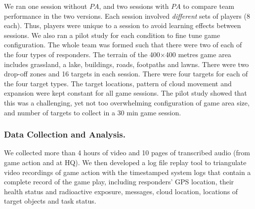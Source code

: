 We ran one session without $PA$, and two sessions with $PA$  to compare team performance in the two versions. Each session involved \emph{different} sets of players (8 each). Thus,  players were unique to a session to avoid learning effects between sessions. We also ran a pilot study for each condition to fine tune game configuration. The whole team was formed such that there were two of each of the four types of responders. The terrain of the 400$\times$400 metres  game area includes grassland, a lake, buildings, roads,  footpaths and lawns. There were two  drop-off zones and 16 targets in each session. There were four targets for each of the four target types. The target locations, pattern of cloud movement and expansion were kept constant for all game sessions. The pilot study showed that this was a challenging, yet not too overwhelming configuration of game area size, and number of targets to collect in a 30 min game session. 

\subsubsection{Data Collection and Analysis.}
\noindent 
We collected more than 4 hours of video and 10 pages of transcribed audio (from game action and at HQ). We then developed a log file replay tool to triangulate video recordings of game action with the timestamped system logs that contain a complete record of the game play, including responders' GPS location, their health status and radioactive exposure, messages, cloud location, locations of target objects and task status.

